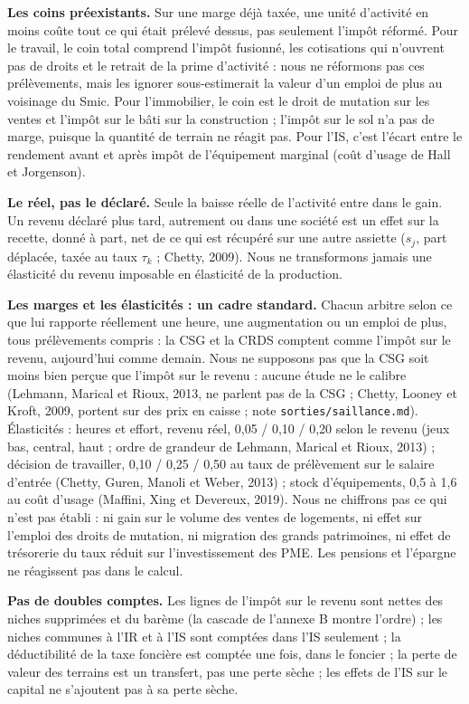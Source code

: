 \documentclass[10pt,a4paper]{article}
\begin{document}
\textbf{Les coins préexistants.} Sur une marge déjà taxée, une unité d'activité en moins coûte tout ce qui était
prélevé dessus, pas seulement l'impôt réformé. Pour le travail, le coin total comprend l'impôt fusionné, les cotisations
qui n'ouvrent pas de droits et le retrait de la prime d'activité : nous ne réformons pas ces prélèvements, mais les
ignorer sous-estimerait la valeur d'un emploi de plus au voisinage du Smic. Pour l'immobilier, le coin est le droit de
mutation sur les ventes et l'impôt sur le bâti sur la construction ; l'impôt sur le sol n'a pas de marge, puisque la
quantité de terrain ne réagit pas. Pour l'IS, c'est l'écart entre le rendement avant et après impôt de l'équipement
marginal (coût d'usage de Hall et Jorgenson).

\textbf{Le réel, pas le déclaré.} Seule la baisse réelle de l'activité entre dans le gain. Un revenu déclaré plus tard,
autrement ou dans une société est un effet sur la recette, donné à part, net de ce qui est récupéré sur une autre
assiette ($s_j$, part déplacée, taxée au taux $\tau_k$ ; Chetty, 2009). Nous ne transformons jamais une élasticité du
revenu imposable en élasticité de la production.

\textbf{Les marges et les élasticités : un cadre standard.} Chacun arbitre selon ce que lui rapporte réellement une
heure, une augmentation ou un emploi de plus, tous prélèvements compris : la CSG et la CRDS comptent comme l'impôt sur
le revenu, aujourd'hui comme demain. Nous ne supposons pas que la CSG soit moins bien perçue que l'impôt sur le revenu : aucune étude ne le calibre
(Lehmann, Marical et Rioux, 2013, ne parlent pas de la CSG ; Chetty, Looney et Kroft, 2009, portent sur des prix en
caisse ; note \texttt{sorties/saillance.md}). Élasticités : heures et effort, revenu réel, 0,05 / 0,10 / 0,20 selon
le revenu (jeux bas, central, haut ; ordre de grandeur de Lehmann, Marical et Rioux, 2013) ; décision de travailler,
0,10 / 0,25 / 0,50 au taux de prélèvement sur le salaire d'entrée (Chetty, Guren, Manoli et Weber, 2013) ; stock
d'équipements, 0,5 à 1,6 au coût d'usage (Maffini, Xing et Devereux, 2019). Nous ne chiffrons pas ce qui n'est pas
établi : ni gain sur le volume des ventes de logements, ni effet sur l'emploi des droits de mutation, ni migration des
grands patrimoines, ni effet de trésorerie du taux réduit sur l'investissement des PME. Les pensions et l'épargne ne
réagissent pas dans le calcul.

\textbf{Pas de doubles comptes.} Les lignes de l'impôt sur le revenu sont nettes des niches supprimées et du barème
(la cascade de l'annexe B montre l'ordre) ; les niches communes à l'IR et à l'IS sont comptées dans l'IS seulement ; la
déductibilité de la taxe foncière est comptée une fois, dans le foncier ; la perte de valeur des terrains est un
transfert, pas une perte sèche ; les effets de l'IS sur le capital ne s'ajoutent pas à sa perte sèche.
\end{document}

